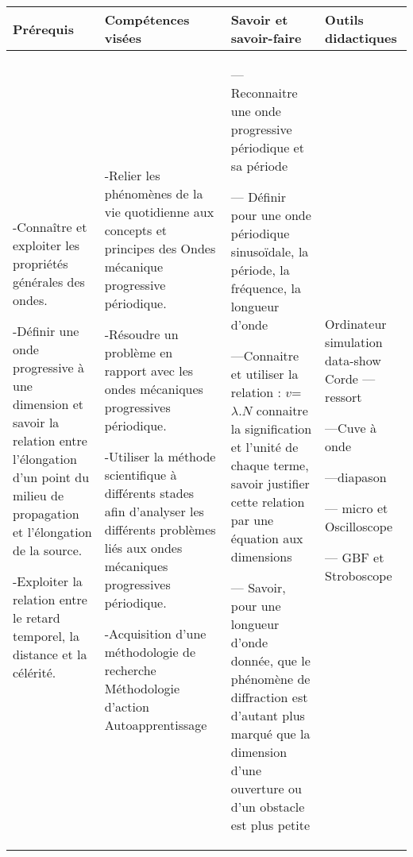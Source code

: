 \documentclass[12pt]{article}
\begin{document}
 \begin{center}
	 \begin{tabular}{|p{}||p{}||p{}||p{}|}
\hline
\textbf{Prérequis} & \textbf{Compétences visées } & \textbf{Savoir et savoir-faire}&\textbf{Outils didactiques }\\
    \hline

-Connaître et exploiter les
propriétés générales des
ondes.

-Définir une onde progressive à
une dimension et savoir la
relation entre l'élongation d'un
point du milieu de
propagation et l'élongation de
la source.

-Exploiter la relation entre le
retard temporel, la distance
et la célérité.



				   &
				 -Relier les phénomènes de la
vie quotidienne aux concepts
et principes des Ondes mécanique progressive périodique.

-Résoudre un problème en rapport avec les ondes mécaniques progressives périodique.

-Utiliser la méthode scientifique à différents stades afin d'analyser les différents problèmes liés aux ondes mécaniques progressives périodique.

-Acquisition d'une
méthodologie de recherche
Méthodologie d'action Autoapprentissage

 & 
--- Reconnaitre une onde progressive périodique et sa période

--- Définir pour une onde périodique sinusoïdale, la période, la fréquence, la longueur d’onde

---Connaitre et utiliser la relation : $v$=$\lambda.N$ connaitre la signification et l’unité de chaque terme,
savoir justifier cette relation par une équation aux dimensions

--- Savoir, pour une longueur d’onde donnée, que le phénomène de diffraction est d’autant plus
marqué que la dimension d’une ouverture ou d’un obstacle est plus petite

 & Ordinateur  simulation data-show 
Corde ---ressort 

---Cuve à onde  

---diapason

--- micro et Oscilloscope

--- GBF et Stroboscope

\\
    \hline
\end{tabular} 
\end{center}
\end{document}

